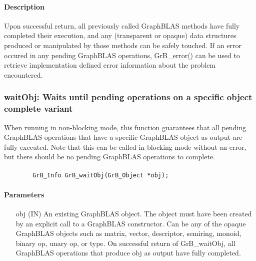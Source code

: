 \paragraph{Description}

Upon successful return, all previously called GraphBLAS methods have fully
completed their execution, and any (transparent or opaque) data structures
produced or manipulated by those methods can be safely touched.  If an
error occured in any pending GraphBLAS operations, {\sf GrB\_error()}
can be used to retrieve implementation defined error information about
the problem encountered.

\subsubsection{{\sf waitObj}: Waits until pending operations on a specific object complete variant}
\label{Sec:GrB_waitOne}

When running in non-blocking mode, this function guarantees that all
pending GraphBLAS operations that have a specific GraphBLAS object as
output are fully executed.  Note that this can be called in blocking mode
without an error, but there should be no pending GraphBLAS operations
to complete.

\paragraph{\syntax}

\begin{verbatim}
        GrB_Info GrB_waitObj(GrB_Object *obj);
\end{verbatim}

\paragraph{Parameters}

\begin{itemize}[leftmargin=1.1in]
        \item[{\sf obj}] ({\sf IN}) An existing GraphBLAS object.
        The object must have been created by an explicit call to a
        GraphBLAS constructor.  Can be any of the opaque GraphBLAS
        objects such as matrix, vector, descriptor, semiring, monoid,
        binary op, unary op, or type. On successful return of {\sf
        GrB\_waitObj}, all GraphBLAS operations that produce {\sf obj}
        as output have fully completed.
\end{itemize}

